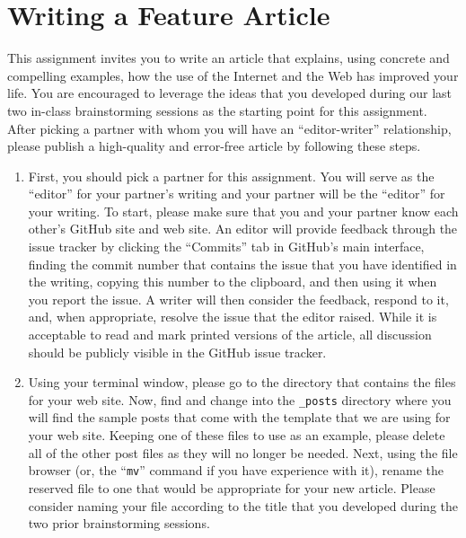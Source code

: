 \section*{Writing a Feature Article}

This assignment invites you to write an article that explains, using concrete and compelling examples, how the use of
the Internet and the Web has improved your life. You are encouraged to leverage the ideas that you developed during our
last two in-class brainstorming sessions as the starting point for this assignment. After picking a partner with whom
you will have an ``editor-writer'' relationship, please publish a high-quality and error-free article by following these
steps.

\vspace*{-.1in}

\begin{enumerate}

  \itemsep 0em

  \item First, you should pick a partner for this assignment. You will serve as the ``editor'' for your partner's
    writing and your partner will be the ``editor'' for your writing. To start, please make sure that you and your
    partner know each other's GitHub site and web site. An editor will provide feedback through the issue tracker by
    clicking the ``Commits'' tab in GitHub's main interface, finding the commit number that contains the issue that you
    have identified in the writing, copying this number to the clipboard, and then using it when you report the issue. A
    writer will then consider the feedback, respond to it, and, when appropriate, resolve the issue that the editor
    raised. While it is acceptable to read and mark printed versions of the article, all discussion should be publicly
    visible in the GitHub issue tracker.

  \item Using your terminal window, please go to the directory that contains the files for your web site. Now, find and
    change into the {\tt \_posts} directory where you will find the sample posts that come with the template that we are
    using for your web site. Keeping one of these files to use as an example, please delete all of the other post files
    as they will no longer be needed. Next, using the file browser (or, the ``{\tt mv}'' command if you have experience
    with it), rename the reserved file to one that would be appropriate for your new article. Please consider naming
    your file according to the title that you developed during the two prior brainstorming sessions.


\end{enumerate}
